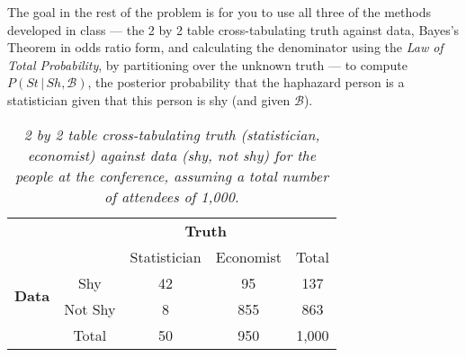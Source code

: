 \documentclass[12pt]{article}
\newcommand{\given}{\, | \,}
\begin{document}
\newpage

The goal in the rest of the problem is for you to use all three of the methods developed in class --- the 2 by 2 table cross-tabulating truth against data, Bayes's Theorem in odds ratio form, and calculating the denominator using the \textit{Law of Total Probability}, by partitioning over the unknown truth --- to compute $P ( St \given Sh, \mathcal{ B } )$, the posterior probability that the haphazard person is a statistician given that this person is shy (and given $\mathcal{ B }$).

\begin{table}[t!]

\centering

\caption{\textit{2 by 2 table cross-tabulating truth (statistician, economist) against data (shy, not shy) for the people at the conference, assuming a total number of attendees of 1,000.}}

\label{t:basic-table-1}

\bigskip

\begin{tabular}{cc|c|c|c}

& \multicolumn{1}{c}{} & \multicolumn{2}{c}{\textbf{Truth}} \\

& \multicolumn{1}{c}{} & \multicolumn{1}{c}{Statistician} & \multicolumn{1}{c}{Economist}  & Total \\ \cline{3-4}

\multirow{2}{*}{\textbf{Data}} & Shy & 42 & 95 & 137 \\ \cline{3-4}

& Not Shy & 8 & 855 & 863 \\ \cline{3-4}

& \multicolumn{1}{c}{Total} & \multicolumn{1}{c}{50} & \multicolumn{1}{c}{950} & 1,000

\end{tabular}

\end{table}
\end{document}
